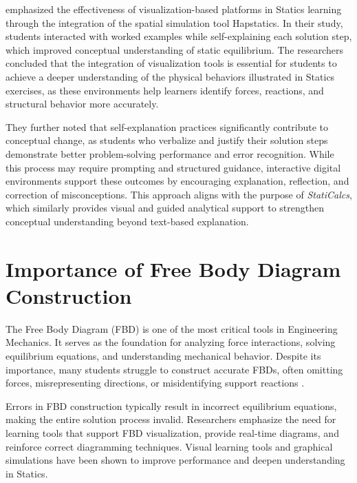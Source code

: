 \cite{de_la_hoz_promoting_2022} emphasized the effectiveness of visualization-based platforms in Statics learning through the integration of the spatial simulation tool Hapstatics. In their study, students interacted with worked examples while self-explaining each solution step, which improved conceptual understanding of static equilibrium. The researchers concluded that the integration of visualization tools is essential for students to achieve a deeper understanding of the physical behaviors illustrated in Statics exercises, as these environments help learners identify forces, reactions, and structural behavior more accurately.

They further noted that self-explanation practices significantly contribute to conceptual change, as students who verbalize and justify their solution steps demonstrate better problem-solving performance and error recognition. While this process may require prompting and structured guidance, interactive digital environments support these outcomes by encouraging explanation, reflection, and correction of misconceptions. This approach aligns with the purpose of \textit{StatiCalcs}, which similarly provides visual and guided analytical support to strengthen conceptual understanding beyond text-based explanation.



\section{Importance of Free Body Diagram Construction}

The Free Body Diagram (FBD) is one of the most critical tools in Engineering Mechanics. It serves as the foundation for analyzing force interactions, solving equilibrium equations, and understanding mechanical behavior. Despite its importance, many students struggle to construct accurate FBDs, often omitting forces, misrepresenting directions, or misidentifying support reactions \autocite{salami_challenges_2025}.

Errors in FBD construction typically result in incorrect equilibrium equations, making the entire solution process invalid. Researchers emphasize the need for learning tools that support FBD visualization, provide real-time diagrams, and reinforce correct diagramming techniques. Visual learning tools and graphical simulations have been shown to improve performance and deepen understanding in Statics.


